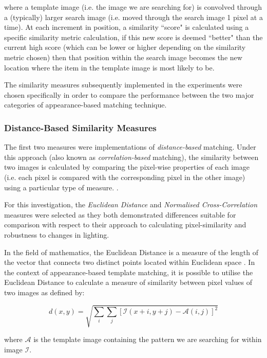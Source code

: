 where a template image (i.e. the image we are searching for) is convolved through a (typically) larger search image (i.e. moved through the search image 1 pixel at a time). At each increment in position,  a similarity ``score" is calculated using a specific similarity metric calculation, if this new score is deemed ``better" than the current high score (which can be lower or higher depending on the similarity metric chosen) then that position within the search image becomes the new location where the item in the template image is most likely to be.

The similarity measures subsequently implemented in the experiments were chosen specifically in order to compare the performance between the two major categories of appearance-based matching technique. 

\subsubsection{Distance-Based Similarity Measures}

The first two measures were implementations of \textit{distance-based} matching. Under this approach (also known as \textit{correlation-based} matching), the similarity between two images is calculated by comparing the pixel-wise properties of each image (i.e. each pixel is compared with the corresponding pixel in the other image) using a particular type of measure. \cite{szeliski}. 

For this investigation, the \textit{Euclidean Distance} and \textit{Normalised Cross-Correlation} measures were selected as they both demonstrated differences suitable for comparison with respect to their approach to calculating pixel-similarity and robustness to changes in lighting. 

In the field of mathematics, the Euclidean Distance is a measure of the length of the vector that connects two distinct points located within Euclidean space \cite{szeliski}. In the context of appearance-based template matching, it is possible to utilise the Euclidean Distance to calculate a measure of similarity between pixel values of two images as defined by:

\begin{equation}
d(x, y) = \sqrt{\sum\limits_{i}\sum\limits_{j}[\mathcal{I}(x + i, y + j) - \mathcal{A}(i, j)]^2}
\end{equation}

where $\mathcal{A}$ is the template image containing the pattern we are searching for within image $\mathcal{I}$. 

